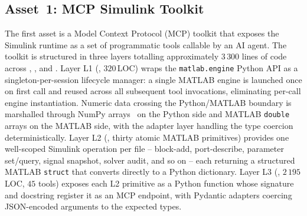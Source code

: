 \documentclass{unnc-fyp}
\begin{document}
\subsection{Asset~1: MCP Simulink Toolkit}
\label{sec:asset-mcp}

The first asset is a Model Context Protocol (MCP) toolkit that
exposes the Simulink runtime as a set of programmatic tools
callable by an AI agent.
The toolkit is structured in three layers totalling approximately
$3\,300$ lines of code across
,
, and .
Layer L1 (, $320$\,LOC) wraps the
\verb|matlab.engine| Python API as a singleton-per-session
lifecycle manager: a single MATLAB engine is launched once on
first call and reused across all subsequent tool invocations,
eliminating per-call engine instantiation.
Numeric data crossing the Python/MATLAB boundary is marshalled
through NumPy arrays~\cite{harris2020numpy} on the Python side and
MATLAB \verb|double| arrays on the MATLAB side, with the
adapter layer handling the type coercion deterministically.
Layer L2 (, thirty atomic MATLAB primitives)
provides one well-scoped Simulink operation per file --
block-add, port-describe, parameter set/query, signal snapshot,
solver audit, and so on -- each returning a structured MATLAB
\verb|struct| that converts directly to a Python dictionary.
Layer L3 (, $2\,195$\,LOC, $45$ tools)
exposes each L2 primitive as a Python function whose signature
and docstring register it as an MCP endpoint, with Pydantic
adapters coercing JSON-encoded arguments to the expected types.
\end{document}
